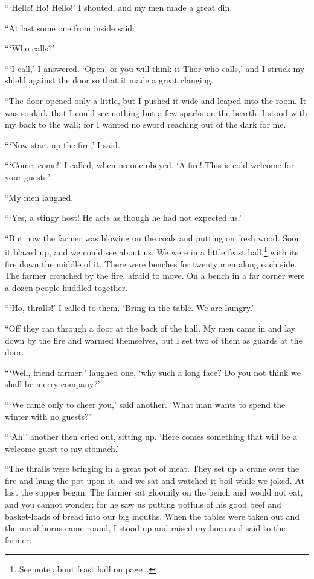 ```Hello! Ho! Hello!' I shouted, and my men made a great din.

``At last some one from inside said:

```Who calls?'

```I call,' I answered. `Open! or you will think it Thor who calls,' and
I struck my shield against the door so that it made a great clanging.

``The door opened only a little, but I pushed it wide and leaped into the
room. It was so dark that I could see nothing but a few sparks on the
hearth. I stood with my back to the wall; for I wanted no sword reaching
out of the dark for me.

```Now start up the fire,' I said.

```Come, come!' I called, when no one obeyed. `A fire! This is cold
welcome for your guests.'

``My men laughed.

```Yes, a stingy host! He acts as though he had not expected us.'

``But now the farmer was blowing on the coals and putting on fresh wood.
Soon it blazed up, and we could see about us. We were in a little feast
hall,\footnote{See note about feast hall on page~\pageref{feast-hall}.}
with its fire down the middle of it. There were benches for twenty men
along each side. The farmer crouched by the fire, afraid to move. On a
bench in a far corner were a dozen people huddled together.

```Ho, thralls!' I called to them. `Bring in the table. We are hungry.'

``Off they ran through a door at the back of the hall. My men came in and
lay down by the fire and warmed themselves, but I set two of them as
guards at the door.

```Well, friend farmer,' laughed one, `why such a long face? Do you not
think we shall be merry company?'

```We came only to cheer you,' said another. `What man wants to spend the
winter with no guests?'

```Ah!' another then cried out, sitting up. `Here comes something that
will be a welcome guest to my stomach.'

``The thralls were bringing in a great pot of meat. They set up a crane
over the fire and hung the pot upon it, and we sat and watched it boil
while we joked. At last the supper began. The farmer sat gloomily on the
bench and would not eat, and you cannot wonder; for he saw us putting
potfuls of his good beef and basket-loads of bread into our big mouths.
When the tables were taken out and the mead-horns came round, I stood up
and raised my horn and said to the farmer:


